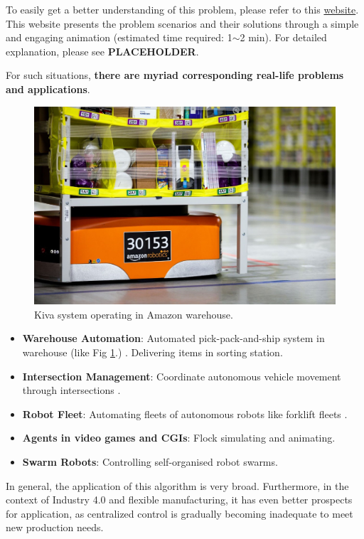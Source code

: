 To easily get a better understanding of this problem, please refer to this \href{https://primalgrid.netlify.app/primal}{website}\footnotemark. 
This website presents the problem scenarios and their solutions through a simple and engaging animation (estimated time required: 1$\sim$2 min). 
For detailed explanation, please see \textbf{PLACEHOLDER}.

For such situations, \textbf{there are myriad corresponding real-life problems and applications}.

\begin{figure}
    \centering
    \includegraphics[width=0.6\linewidth]{figures/Amazon_Warehouse.jpeg}
    \caption{Kiva system operating in Amazon warehouse.\protect\footnotemark}
    \label{fig:Amazon Warehouse Robots}
\end{figure}



\begin{itemize}
    \item \textbf{Warehouse Automation}: Automated pick-pack-and-ship system in warehouse (like Fig \ref{fig:Amazon Warehouse Robots}.) \cite{Amazon_Kiva}. Delivering items in sorting station\cite{Warehouse_Automation1,Warehouse_Automation2}.
    \item \textbf{Intersection Management}: Coordinate autonomous vehicle movement through intersections \cite{Intersection_Management}.
    \item \textbf{Robot Fleet}: Automating fleets of autonomous robots like forklift fleets \cite{Fork_Fleet1,Fork_Fleet2}.  
    \item \textbf{Agents in video games and CGIs}: Flock simulating and animating\cite{Flocking_1,Flocking_2}.
    \item \textbf{Swarm Robots}: Controlling self-organised robot swarms\cite{Swarm_Robotics}.
\end{itemize}

In general, the application of this algorithm is very broad. Furthermore, in the context of Industry 4.0 and flexible manufacturing, it has even better prospects for application\cite{Industry_41,Industry_42,Industry_43}, as centralized control is gradually becoming inadequate to meet new production needs.
